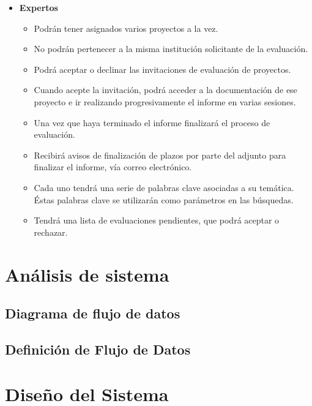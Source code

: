 \documentclass[12pt,a4paper,spanish,twoside]{article}
\begin{document}
\begin{itemize}
\item \textbf{Expertos}
\begin{itemize}
\item Podrán tener asignados varios proyectos a la vez. 
\item No podrán pertenecer a la misma institución solicitante de la evaluación.
\item Podrá aceptar o declinar las invitaciones de evaluación de proyectos.
\item Cuando acepte la invitación, podrá acceder a la documentación de ese proyecto e ir realizando 
progresivamente el informe en varias sesiones.
\item Una vez que haya terminado el informe finalizará el proceso de evaluación.
\item Recibirá avisos de finalización de plazos por parte del adjunto para finalizar el informe, 
vía correo electrónico.
\item Cada uno tendrá una serie de palabras clave asociadas a su temática. Éstas palabras clave se 
utilizarán como parámetros en las búsquedas.
\item Tendrá una lista de evaluaciones pendientes, que podrá aceptar o rechazar.
\end{itemize}

\end{itemize}

\section{Análisis de sistema}
\subsection{Diagrama de flujo de datos}


\subsection{Definición de Flujo de Datos}
%

\section{Diseño del Sistema}
\end{document}
